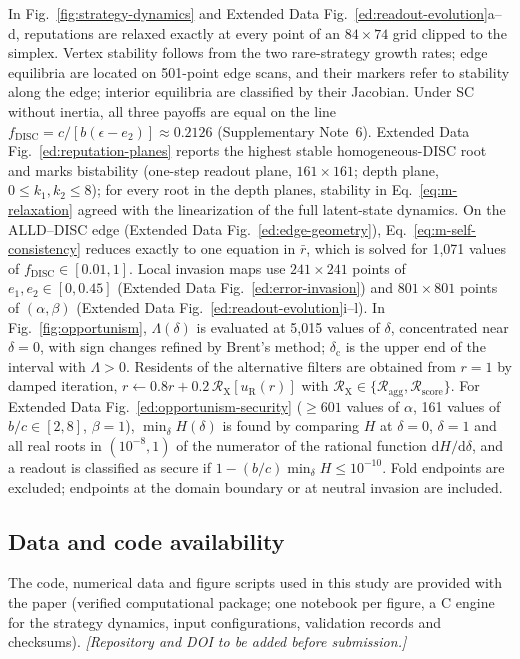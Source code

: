 In Fig.~\ref{fig:strategy-dynamics} and Extended Data
Fig.~\ref{ed:readout-evolution}a--d, reputations are relaxed exactly at every
point of an $84\times74$ grid clipped to the simplex. Vertex stability follows
from the two rare-strategy growth rates; edge equilibria are located on
501-point edge scans, and their markers refer to stability along the edge;
interior equilibria are classified by their Jacobian. Under SC without inertia,
all three payoffs are equal on the line
$f_{\mathrm{DISC}}=c/[b(\epsilon-e_2)]\approx0.2126$ (Supplementary Note~6).
Extended Data Fig.~\ref{ed:reputation-planes} reports the highest stable
homogeneous-DISC root and marks bistability (one-step readout plane,
$161\times161$; depth plane, $0\le k_1,k_2\le8$); for every root in the depth
planes, stability in Eq.~\eqref{eq:m-relaxation} agreed with the linearization of
the full latent-state dynamics. On the ALLD--DISC edge (Extended Data
Fig.~\ref{ed:edge-geometry}), Eq.~\eqref{eq:m-self-consistency} reduces exactly
to one equation in $\bar r$, which is solved for 1,071 values of
$f_{\mathrm{DISC}}\in[0.01,1]$. Local invasion maps use $241\times241$ points of
$e_1,e_2\in[0,0.45]$ (Extended Data Fig.~\ref{ed:error-invasion}) and
$801\times801$ points of $(\alpha,\beta)$ (Extended Data
Fig.~\ref{ed:readout-evolution}i--l). In Fig.~\ref{fig:opportunism},
$\Lambda(\delta)$ is evaluated at 5,015 values of $\delta$, concentrated near
$\delta=0$, with sign changes refined by Brent's method; $\delta_{\mathrm c}$ is
the upper end of the interval with $\Lambda>0$. Residents of the alternative
filters are obtained from $r=1$ by damped iteration,
$r\leftarrow0.8r+0.2\,\mathcal R_{\mathrm X}[u_{\mathrm R}(r)]$ with
$\mathcal R_{\mathrm X}\in\{\mathcal R_{\mathrm{agg}},\mathcal R_{\mathrm{score}}\}$.
For Extended Data Fig.~\ref{ed:opportunism-security} ($\ge601$ values of
$\alpha$, 161 values of $b/c\in[2,8]$, $\beta=1$), $\min_\delta H(\delta)$ is
found by comparing $H$ at $\delta=0$, $\delta=1$ and all real roots in
$(10^{-8},1)$ of the numerator of the rational function
$\mathrm dH/\mathrm d\delta$, and a readout is classified as secure if
$1-(b/c)\min_\delta H\le10^{-10}$. Fold endpoints are excluded; endpoints at the
domain boundary or at neutral invasion are included.

\subsection*{Data and code availability}

The code, numerical data and figure scripts used in this study are provided
with the paper (verified computational package; one notebook per figure, a C
engine for the strategy dynamics, input configurations, validation records and
checksums). \textit{[Repository and DOI to be added before submission.]}
